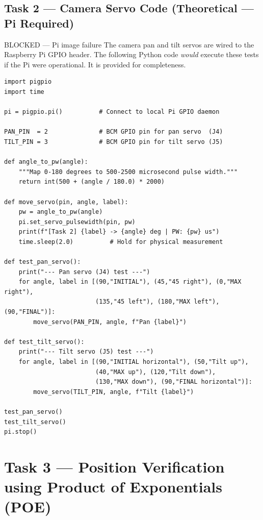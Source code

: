 \documentclass[12pt,a4paper]{article}
\begin{document}
\subsection{Task 2 --- Camera Servo Code (Theoretical --- Pi Required)}

\begin{dangerbox}{BLOCKED --- Pi image failure}
The camera pan and tilt servos are wired to the Raspberry Pi GPIO header.
The following Python code \emph{would} execute these tests if the Pi were
operational. It is provided for completeness.
\end{dangerbox}

\begin{lstlisting}[style=python,caption={Task 2 camera servo code --- Pi version (theoretical)}]
import pigpio
import time

pi = pigpio.pi()          # Connect to local Pi GPIO daemon

PAN_PIN  = 2              # BCM GPIO pin for pan servo  (J4)
TILT_PIN = 3              # BCM GPIO pin for tilt servo (J5)

def angle_to_pw(angle):
    """Map 0-180 degrees to 500-2500 microsecond pulse width."""
    return int(500 + (angle / 180.0) * 2000)

def move_servo(pin, angle, label):
    pw = angle_to_pw(angle)
    pi.set_servo_pulsewidth(pin, pw)
    print(f"[Task 2] {label} -> {angle} deg | PW: {pw} us")
    time.sleep(2.0)          # Hold for physical measurement

def test_pan_servo():
    print("--- Pan servo (J4) test ---")
    for angle, label in [(90,"INITIAL"), (45,"45 right"), (0,"MAX right"),
                         (135,"45 left"), (180,"MAX left"), (90,"FINAL")]:
        move_servo(PAN_PIN, angle, f"Pan {label}")

def test_tilt_servo():
    print("--- Tilt servo (J5) test ---")
    for angle, label in [(90,"INITIAL horizontal"), (50,"Tilt up"),
                         (40,"MAX up"), (120,"Tilt down"),
                         (130,"MAX down"), (90,"FINAL horizontal")]:
        move_servo(TILT_PIN, angle, f"Tilt {label}")

test_pan_servo()
test_tilt_servo()
pi.stop()
\end{lstlisting}

\newpage
\section{Task 3 --- Position Verification using Product of Exponentials (POE)}
\end{document}
